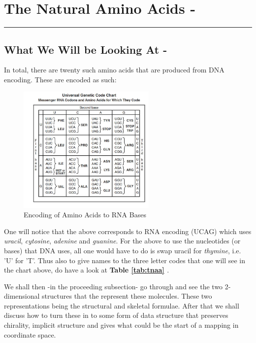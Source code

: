 \documentclass[a4paper,10pt]{article}
\begin{document}
\section{The Natural Amino Acids -}
\rule{\textwidth}{1pt}
\subsection{What We Will be Looking At -}
In total, there are twenty such amino acids that are produced from DNA encoding. These are encoded as such:
\begin{figure}[H]
\centering
\includegraphics[width=0.6\textwidth]{images/rna_ecode.png}
\caption{Encoding of Amino Acids to RNA Bases}
\label{fig:rna_chart}
\end{figure}
One will notice that the above corresponds to RNA encoding (UCAG) which uses \textit{uracil}, \textit{cytosine}, \textit{adenine} and \textit{guanine}. For the above to use the nucleotides (or bases) that DNA uses, all one would have to do is swap uracil for \textit{thymine}, i.e. 'U' for 'T'. Thus also to give names to the three letter codes that one will see in the chart above, do have a look at \textbf{Table \ref{tab:tnaa} \cite{chart}}. 

We shall then -in the proceeding subsection- go through and see the two 2-dimensional structures that the represent these molecules. These two representations being the structural and skeletal formulae. After that we shall discuss how to turn these in to some form of data structure that preserves chirality, implicit structure and gives what could be the start of a mapping in coordinate space.
\end{document}
